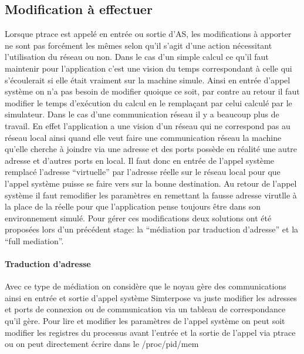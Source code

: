 \subsection{Modification à effectuer}
Lorsque ptrace est appelé en entrée ou sortie d'AS, les modifications à apporter ne sont pas forcément les mêmes selon qu'il s'agit d'une action nécessitant l'utilisation du réseau ou non. Dans le cas d'un simple calcul ce qu'il faut maintenir pour l'application c'est une vision du temps correspondant à celle qui s'écoulerait si elle était vraiment sur la machine simule. Ainsi en entrée d'appel système on n'a pas besoin de modifier quoique ce soit, par contre au retour il faut modifier le temps d'exécution du calcul en le remplaçant par celui calculé par le simulateur. Dans le cas d'une communication réseau il y a beaucoup plus de travail. En effet l'application a une vision d'un réseau qui ne correspond pas au réseau local ainsi quand elle veut faire une communication réseau la machine qu'elle cherche à joindre via une adresse et des ports possède en réalité une autre adresse et d'autres ports en local. Il faut donc en entrée de l'appel système remplacé l'adresse ``virtuelle'' par l'adresse réelle sur le réseau local pour que l'appel système puisse se faire vers sur la bonne destination. Au retour de l'appel système il faut remodifier les paramètres en remettant la fausse adresse virutlle à la place de la réelle pour que l'application pense toujours être dans son environnement simulé. Pour gérer ces modifications deux solutions ont été proposées lors d'un précédent stage: la  ``médiation par traduction d'adresse'' et la ``full mediation''.
\paragraph{Traduction d'adresse} Avec ce type de médiation on considère que le noyau gère des communications ainsi en entrée et sortie d'appel système Simterpose va juste modifier les adresses et ports de connexion ou de communication via un tableau de correspondance qu'il gère. Pour lire et modifier les paramètres de l'appel système on peut soit modifier les registres du processus avant l'entrée et la sortie de l'appel via ptrace {\color{red}ou on peut directement écrire dans le /proc/pid/mem}
